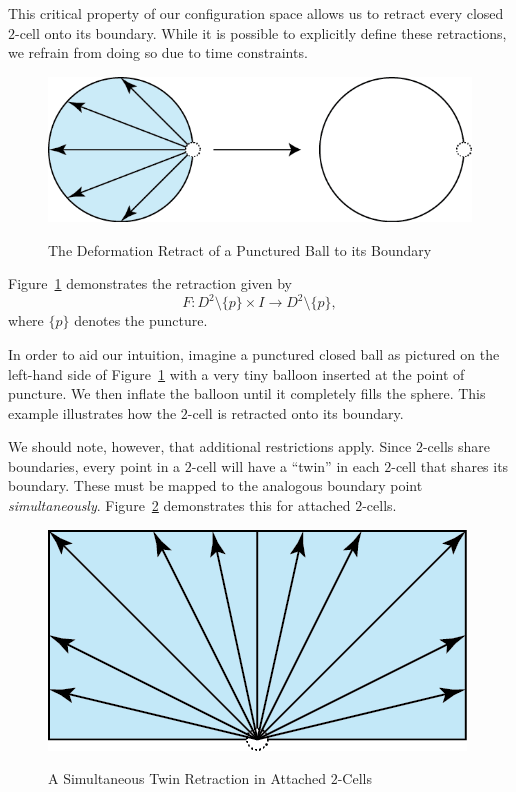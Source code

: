 \documentclass[12pt,oneside]{amsbook}
\begin{document}
This critical property of our configuration space allows us to retract every closed $2$-cell onto its boundary. While it is possible to explicitly define these retractions, we refrain from doing so due to time constraints.

\begin{figure}[h]
\centering
\caption{The Deformation Retract of a Punctured Ball to its Boundary}
\includegraphics[scale=1]{PuncturedBall.png}
\label{fig:pball}
\end{figure}

Figure~\ref{fig:pball} demonstrates the retraction given by $$F\colon D^2\setminus \{p\}\times I \rightarrow D^2\setminus \{p\},$$ where $\{p\}$ denotes the puncture. 

In order to aid our intuition, imagine a punctured closed ball as pictured on the left-hand side of Figure~\ref{fig:pball} with a very tiny balloon inserted at the point of puncture. We then inflate the balloon until it completely fills the sphere. This example illustrates how the $2$-cell is retracted onto its boundary. 

We should note, however, that additional restrictions apply. Since $2$-cells share boundaries, every point in a $2$-cell will have a ``twin'' in each $2$-cell that shares its boundary. These  must be mapped to the analogous boundary point \textit{simultaneously}. Figure~\ref{fig:twins} demonstrates this for attached $2$-cells. 


\begin{figure}[ht]
\centering
\caption{A Simultaneous Twin Retraction in Attached $2$-Cells}
\vspace{3mm}
\includegraphics[scale=1]{Twins.png}
\label{fig:twins}
\end{figure}
\end{document}
